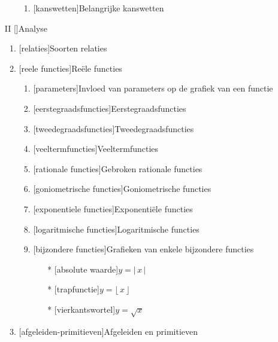 \documentclass{article}
\begin{document}
\begin{itemize}
\begin{enumerate}
\begin{enumerate}
\item {}[kanswetten]{Belangrijke kanswetten}
\end{enumerate}%
\end{enumerate}%
\item[II] []{Analyse}
\begin{enumerate}%
\item {}[relaties]{Soorten relaties}
\item {}[reele functies]{Re\"ele functies}
\begin{enumerate}%
\item {}[parameters]{Invloed van parameters op de grafiek van een functie}
\item {}[eerstegraadsfuncties]{Eerstegraadsfuncties}
\item {}[tweedegraadsfuncties]{Tweedegraadsfuncties}
\item {}[veeltermfuncties]{Veeltermfuncties}
\item {}[rationale functies]{Gebroken rationale functies}
\item {}[goniometrische functies]{Goniometrische functies}
\item {}[exponentiele functies]{Exponenti\"ele functies}
\item {}[logaritmische functies]{Logaritmische functies}
\item {}[bijzondere functies]{Grafieken van enkele bijzondere functies}
		\begin{itemize}
		\item[*] [absolute waarde]{$y=|\,x\,|$}
		\item[*] [trapfunctie]{$y=\lfloor 				\,x\,\rfloor$}
		\item[*] [vierkantswortel]{$y=\sqrt{x}$}
		\end{itemize}
\end{enumerate}%
\item {}[afgeleiden-primitieven]{Afgeleiden en primitieven}

\end{enumerate}
\end{itemize}
\end{document}
